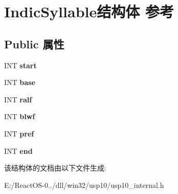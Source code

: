 \hypertarget{struct_indic_syllable}{}\section{Indic\+Syllable结构体 参考}
\label{struct_indic_syllable}
\subsection*{Public 属性}
\begin{DoxyCompactItemize}
\item 
\mbox{\label{struct_indic_syllable_a3b117e33bcc850bf54a14457be6dee21}} 
I\+NT {\bfseries start}
\item 
\mbox{\label{struct_indic_syllable_ab53c92f23cf3967c2057637e6c231265}} 
I\+NT {\bfseries base}
\item 
\mbox{\label{struct_indic_syllable_a4e4078d4e92a87e8c309b173b44a2675}} 
I\+NT {\bfseries ralf}
\item 
\mbox{\label{struct_indic_syllable_a2c9a6599336556a1d2f0db65f01c3fbc}} 
I\+NT {\bfseries blwf}
\item 
\mbox{\label{struct_indic_syllable_af10bb5f2cac54edb6248d6841351971b}} 
I\+NT {\bfseries pref}
\item 
\mbox{\label{struct_indic_syllable_a254c287a2f7eda11bf04806aa543b378}} 
I\+NT {\bfseries end}
\end{DoxyCompactItemize}


该结构体的文档由以下文件生成\+:\begin{DoxyCompactItemize}
\item 
E\+:/\+React\+O\+S-\/0../dll/win32/usp10/usp10\+\_\+internal.\+h\end{DoxyCompactItemize}
